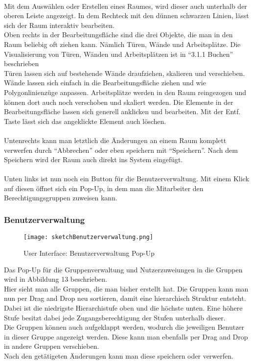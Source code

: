 \paragraph{}Mit dem Auswählen oder Erstellen eines Raumes, wird dieser auch unterhalb der oberen Leiste angezeigt. 
In dem Rechteck mit den dünnen schwarzen Linien, lässt sich der Raum interaktiv bearbeiten.
\\
Oben rechts in der Bearbeitungsfläche sind die drei Objekte, die man in den Raum beliebig oft ziehen kann.
Nämlich Türen, Wände und Arbeitsplätze.
Die Visualisierung von Türen, Wänden und Arbeitsplätzen ist in "`3.1.1 Buchen"' beschrieben
\\
Türen lassen sich auf bestehende Wände draufziehen, skalieren und verschieben.
Wände lassen sich einfach in die Bearbeitungsfläche ziehen und wie Polygonlinienzüge anpassen.
Arbeitsplätze werden in den Raum reingezogen und können dort auch noch verschoben und skaliert werden.
Die Elemente in der Bearbeitungsfläche lassen sich generell anklicken und bearbeiten.
Mit der Entf. Taste lässt sich das angeklickte Element auch löschen.

\paragraph{} Untenrechts kann man letztlich die Änderungen an einem Raum komplett verwerfen durch "`Abbrechen"'
oder eben speichern mit "`Speichern"'.
Nach dem Speichern wird der Raum auch direkt ins System eingefügt.

\paragraph{} Unten links ist nun noch ein Button für die Benutzerverwaltung.
Mit einem Klick auf diesen öffnet sich ein Pop-Up, in dem man die Mitarbeiter den Berechtigungsgruppen zuweisen kann.

\subsubsection{Benutzerverwaltung}

\newpage
\begin{wrapfigure}{r}{5.5cm}
  \texttt{[image: sketchBenutzerverwaltung.png]}
  \caption{User Interface: Benutzerverwaltung Pop-Up}
\end{wrapfigure}

Das Pop-Up für die Gruppenverwaltung und Nutzerzuweiungen in die Gruppen wird in Abbildung 13 beschrieben.
\\
Hier sieht man alle Gruppen, die man bisher erstellt hat.
Die Gruppen kann man nun per Drag and Drop neu sortieren, damit eine hierarchisch Struktur entsteht.
Dabei ist die niedrigste Hierarchistufe oben und die höchste unten. 
Eine höhere Stufe besitzt dabei jede Zugangsberechtigung der Stufen unterhalb dieser. 
\\
Die Gruppen können auch aufgeklappt werden, wodurch die jeweiligen Benutzer in dieser Gruppe angezeigt werden.
Diese kann man ebenfalls per Drag and Drop in andere Gruppen verschieben.
\\
Nach den getätigeten Änderungen kann man diese speichern oder verwerfen. 